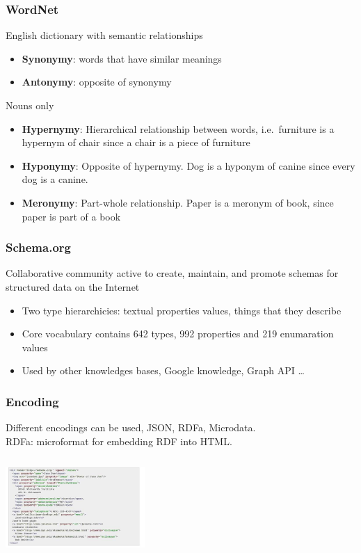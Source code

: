 \subsubsection{WordNet}
English dictionary with semantic relationships
\begin{itemize}
\item \textbf{Synonymy}: words that have similar meanings
\item \textbf{Antonymy}: opposite of synonymy
\end{itemize}
Nouns only
\begin{itemize}
\item \textbf{Hypernymy}: Hierarchical relationship between words,
  i.e.\ furniture is a hypernym of chair since a chair is a piece of
  furniture
\item \textbf{Hyponymy}: Opposite of hypernymy. Dog is a hyponym of
  canine since every dog is a canine.
\item \textbf{Meronymy}: Part-whole relationship. Paper is a meronym
  of book, since paper is part of a book
\end{itemize}

\subsubsection{Schema.org}
Collaborative community active to create, maintain, and promote
schemas for structured data on the Internet
\begin{itemize}
\item Two type hierarchicies: textual properties values, things that
  they describe
\item Core vocabulary contains 642 types, 992 properties and 219
  enumaration values
\item Used by other knowledges bases, Google knowledge, Graph API
  \ldots
\end{itemize}

\subsubsection{Encoding}
Different encodings can be used, JSON, RDFa, Microdata. \\
RDFa: microformat for embedding RDF into HTML.
\includegraphics[width=200px, height=170px]{rdfa}


